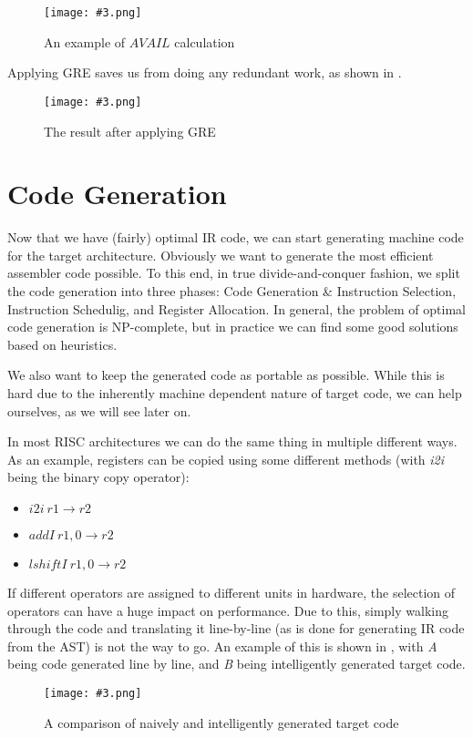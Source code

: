 \documentclass{article}
\newcommand{\fig}[4]{
	\begin{figure}[#1]
		\center
		\texttt{[image: \#3.png]}
		\caption{#4}
		\label{fig:#3}
	\end{figure}
	}
\begin{document}
\fig{h}{}{avail}{An example of $AVAIL$ calculation}

Applying GRE saves us from doing any redundant work, as shown in .

\fig{h}{0.7}{gre}{The result after applying GRE}

\section{Code Generation}
Now that we have (fairly) optimal IR code, we can start generating machine code for the target architecture.
Obviously we want to generate the most efficient assembler code possible.
To this end, in true divide-and-conquer fashion, we split the code generation into three phases: Code Generation \& Instruction Selection, Instruction Schedulig, and Register Allocation.
In general, the problem of optimal code generation is NP-complete, but in practice we can find some good solutions based on heuristics.

We also want to keep the generated code as portable as possible.
While this is hard due to the inherently machine dependent nature of target code, we can help ourselves, as we will see later on.

In most RISC architectures we can do the same thing in multiple different ways.
As an example, registers can be copied using some different methods (with \emph{i2i} being the binary copy operator):
\begin{itemize}
	\item $i2i\ r1 \rightarrow r2$
	\item $addI\ r1, 0 \rightarrow r2$
	\item $lshiftI\ r1, 0 \rightarrow r2$
\end{itemize}
If different operators are assigned to different units in hardware, the selection of operators can have a huge impact on performance.
Due to this, simply walking through the code and translating it line-by-line (as is done for generating IR code from the AST) is not the way to go.
An example of this is shown in , with \emph{A} being code generated line by line, and \emph{B} being intelligently generated target code.

\fig{h}{}{codegeneration}{A comparison of naively and intelligently generated target code}
\end{document}
